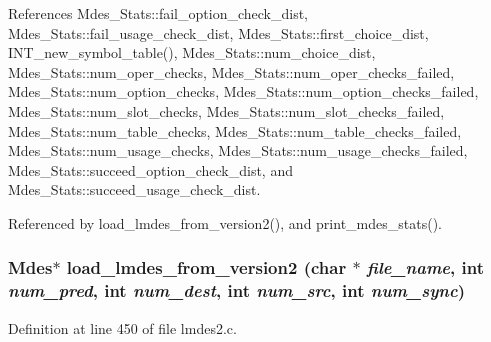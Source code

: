References Mdes\_\-Stats::fail\_\-option\_\-check\_\-dist, Mdes\_\-Stats::fail\_\-usage\_\-check\_\-dist, Mdes\_\-Stats::first\_\-choice\_\-dist, INT\_\-new\_\-symbol\_\-table(), Mdes\_\-Stats::num\_\-choice\_\-dist, Mdes\_\-Stats::num\_\-oper\_\-checks, Mdes\_\-Stats::num\_\-oper\_\-checks\_\-failed, Mdes\_\-Stats::num\_\-option\_\-checks, Mdes\_\-Stats::num\_\-option\_\-checks\_\-failed, Mdes\_\-Stats::num\_\-slot\_\-checks, Mdes\_\-Stats::num\_\-slot\_\-checks\_\-failed, Mdes\_\-Stats::num\_\-table\_\-checks, Mdes\_\-Stats::num\_\-table\_\-checks\_\-failed, Mdes\_\-Stats::num\_\-usage\_\-checks, Mdes\_\-Stats::num\_\-usage\_\-checks\_\-failed, Mdes\_\-Stats::succeed\_\-option\_\-check\_\-dist, and Mdes\_\-Stats::succeed\_\-usage\_\-check\_\-dist.

Referenced by load\_\-lmdes\_\-from\_\-version2(), and print\_\-mdes\_\-stats().
\subsubsection{\setlength{\rightskip}{0pt plus 5cm}\bf{Mdes}$\ast$ load\_\-lmdes\_\-from\_\-version2 (char $\ast$ {\em file\_\-name}, int {\em num\_\-pred}, int {\em num\_\-dest}, int {\em num\_\-src}, int {\em num\_\-sync})}\label{lmdes2_8c_aab44dbf962252b56f0b1b97fd3da680}




Definition at line 450 of file lmdes2.c.

